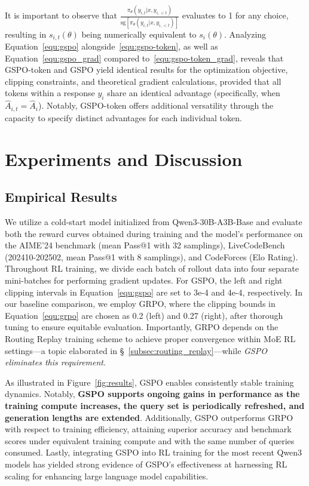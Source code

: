 It is important to observe that $\frac{ \pi_{\theta} (y_{i,t} | x, y_{i,<t}) }{ \mathrm{sg} \left[ \pi_{\theta} (y_{i,t} | x, y_{i,<t}) \right] }$ evaluates to 1 for any choice, resulting in $s_{i,t}(\theta)$ being numerically equivalent to $s_{i}(\theta)$. Analyzing Equation~\eqref{equ:gspo} alongside~\eqref{equ:gspo-token}, as well as Equation~\eqref{equ:gspo_grad} compared to~\eqref{equ:gspo-token_grad}, reveals that GSPO-token and GSPO yield identical results for the optimization objective, clipping constraints, and theoretical gradient calculations, provided that all tokens within a response $y_i$ share an identical advantage (specifically, when $\widehat{A}_{i,t} = \widehat{A}_{i}$). Notably, GSPO-token offers additional versatility through the capacity to specify distinct advantages for each individual token.

\section{Experiments and Discussion}

\subsection{Empirical Results}

We utilize a cold-start model initialized from Qwen3-30B-A3B-Base and evaluate both the reward curves obtained during training and the model’s performance on the AIME'24 benchmark (mean Pass@1 with 32 samplings), LiveCodeBench (202410-202502, mean Pass@1 with 8 samplings), and CodeForces (Elo Rating). Throughout RL training, we divide each batch of rollout data into four separate mini-batches for performing gradient updates. For GSPO, the left and right clipping intervals in Equation~\eqref{equ:gspo} are set to 3e-4 and 4e-4, respectively. In our baseline comparison, we employ GRPO, where the clipping bounds in Equation~\eqref{equ:grpo} are chosen as 0.2 (left) and 0.27 (right), after thorough tuning to ensure equitable evaluation. Importantly, GRPO depends on the Routing Replay training scheme to achieve proper convergence within MoE RL settings—a topic elaborated in \S~\ref{subsec:routing_replay}—while \textit{GSPO eliminates this requirement}.

As illustrated in Figure~\ref{fig:results}, GSPO enables consistently stable training dynamics. Notably, \textbf{GSPO supports ongoing gains in performance as the training compute increases, the query set is periodically refreshed, and generation lengths are extended}. Additionally, GSPO outperforms GRPO with respect to training efficiency, attaining superior accuracy and benchmark scores under equivalent training compute and with the same number of queries consumed. Lastly, integrating GSPO into RL training for the most recent Qwen3 models has yielded strong evidence of GSPO’s effectiveness at harnessing RL scaling for enhancing large language model capabilities.

